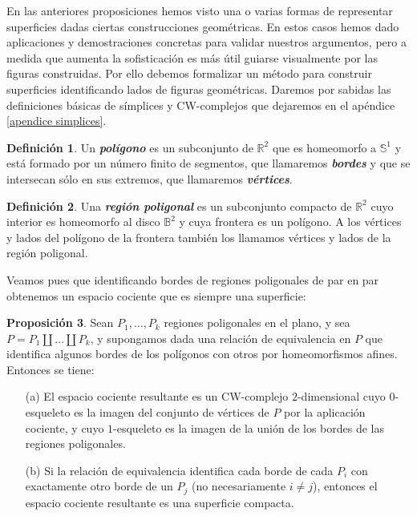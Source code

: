 \documentclass[10pt]{report}
\newcommand{\R}{\mathbb{R}}
\newcommand{\enfatiza}[1]{\textbf{\textit{#1}}}
\theoremstyle{definition}
\newtheorem{defin}{Definición}[section]
\newtheorem{prop}[defin]{Proposición}
\begin{document}
En las anteriores proposiciones hemos visto una o varias formas de representar superficies dadas ciertas construcciones geométricas. En estos casos hemos dado aplicaciones y demostraciones concretas para validar nuestros argumentos, pero a medida que aumenta la sofisticación es más útil guiarse visualmente por las figuras construidas. Por ello debemos formalizar un método para construir superficies identificando lados de figuras geométricas.
Daremos por sabidas las definiciones básicas de símplices y CW-complejos que dejaremos en el apéndice \autoref{apendice simplices}.

\begin{defin}%
Un \enfatiza{polígono} es un subconjunto de $\R^2$ que es homeomorfo a $\mathbb{S}^1$ y está formado por un número finito de segmentos, que llamaremos \enfatiza{bordes} y que se intersecan sólo en sus extremos, que llamaremos \enfatiza{vértices}. %
\end{defin}

\begin{defin}%

Una \enfatiza{región poligonal} es un subconjunto compacto de $\R^2$ cuyo interior es homeomorfo al disco $\mathbb{B}^2$ y cuya frontera es un polígono.
A los vértices y lados del polígono de la frontera también los llamamos vértices y lados de la región poligonal.
\end{defin} 

Veamos pues que identificando bordes de regiones poligonales de par en par obtenemos un espacio cociente que es siempre una superficie:

\begin{prop}%
\label{prop:poligonos}
Sean $P_1,\dots, P_k$ regiones poligonales en el plano, y sea $P=P_1\amalg \dots \amalg P_k$, y supongamos dada una relación de equivalencia en $P$ que identifica algunos bordes de los polígonos con otros por homeomorfismos afines. Entonces se tiene:
\begin{itemize}
\item[(a)] El espacio cociente resultante es un CW-complejo $2$-dimensional cuyo $0$-esqueleto es la imagen del conjunto de vértices de $P$ por la aplicación cociente, y cuyo $1$-esqueleto es la imagen de la unión de los bordes de las regiones poligonales.
\item[(b)] Si la relación de equivalencia identifica cada borde de cada $P_i$ con exactamente otro borde de un $P_j$ (no necesariamente $i\neq j$), entonces el espacio cociente resultante es una superficie compacta.
\end{itemize}
\end{prop}
\end{document}
